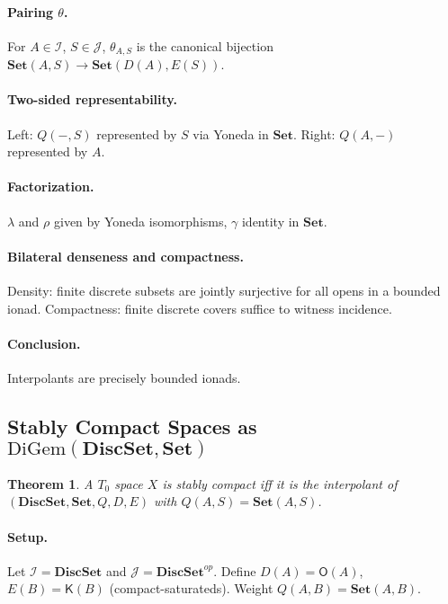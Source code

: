 \documentclass[11pt]{article}
\theoremstyle{plain}
\newtheorem{theorem}{Theorem}[section]
\theoremstyle{definition}
\theoremstyle{remark}
\begin{document}
\paragraph{Pairing $\theta$.}
For $A\in\mathcal{I}$, $S\in\mathcal{J}$, $\theta_{A,S}$ is the canonical bijection $\mathbf{Set}(A,S)\to \mathbf{Set}(D(A),E(S))$.

\paragraph{Two-sided representability.}
Left: $Q(-,S)$ represented by $S$ via Yoneda in $\mathbf{Set}$.  
Right: $Q(A,-)$ represented by $A$.

\paragraph{Factorization.}
$\lambda$ and $\rho$ given by Yoneda isomorphisms, $\gamma$ identity in $\mathbf{Set}$.

\paragraph{Bilateral denseness and compactness.}
Density: finite discrete subsets are jointly surjective for all opens in a bounded ionad.  
Compactness: finite discrete covers suffice to witness incidence.

\paragraph{Conclusion.}
Interpolants are precisely bounded ionads.

\subsection{Stably Compact Spaces as $\mathrm{DiGem}(\mathbf{DiscSet},\mathbf{Set})$}
\begin{theorem}
A $T_{0}$ space $X$ is stably compact iff it is the interpolant of $(\mathbf{DiscSet},\mathbf{Set},Q,D,E)$ with $Q(A,S)=\mathbf{Set}(A,S)$.
\end{theorem}

\paragraph{Setup.}
Let $\mathcal{I}=\mathbf{DiscSet}$ and $\mathcal{J}=\mathbf{DiscSet}^{op}$. Define $D(A)=\mathsf{O}(A)$, $E(B)=\mathsf{K}(B)$ (compact-saturateds). Weight $Q(A,B)=\mathbf{Set}(A,B)$.
\end{document}
